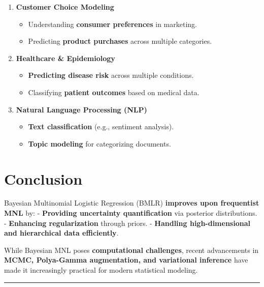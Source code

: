 \documentclass[
  letterpaper,
  DIV=11,
  numbers=noendperiod]{scrartcl}
\providecommand{\tightlist}{%
  \setlength{\itemsep}{0pt}\setlength{\parskip}{0pt}}\usepackage{longtable,booktabs,array}
\begin{document}
\begin{enumerate}
\def\labelenumi{\arabic{enumi}.}
\tightlist
\item
  \textbf{Customer Choice Modeling}

  \begin{itemize}
  \tightlist
  \item
    Understanding \textbf{consumer preferences} in marketing.\\
  \item
    Predicting \textbf{product purchases} across multiple categories.
  \end{itemize}
\item
  \textbf{Healthcare \& Epidemiology}

  \begin{itemize}
  \tightlist
  \item
    \textbf{Predicting disease risk} across multiple conditions.\\
  \item
    Classifying \textbf{patient outcomes} based on medical data.
  \end{itemize}
\item
  \textbf{Natural Language Processing (NLP)}

  \begin{itemize}
  \tightlist
  \item
    \textbf{Text classification} (e.g., sentiment analysis).\\
  \item
    \textbf{Topic modeling} for categorizing documents.
  \end{itemize}
\end{enumerate}

\section{Conclusion}\label{conclusion}

Bayesian Multinomial Logistic Regression (BMLR) \textbf{improves upon
frequentist MNL} by: - \textbf{Providing uncertainty quantification} via
posterior distributions. - \textbf{Enhancing regularization} through
priors. - \textbf{Handling high-dimensional and hierarchical data
efficiently}.

While Bayesian MNL poses \textbf{computational challenges}, recent
advancements in \textbf{MCMC, Polya-Gamma augmentation, and variational
inference} have made it increasingly practical for modern statistical
modeling.

\begin{center}\rule{0.5\linewidth}{0.5pt}\end{center}
\end{document}
